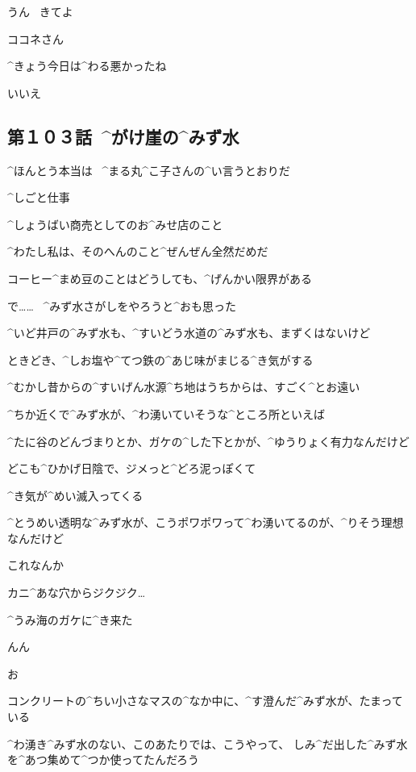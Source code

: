 \Alpha うん
\ きてよ

\page[40]
\Maruko ココネさん

\Maruko ^{きょう}{今日}は^{わる}{悪}かったね

\Kokone いいえ


\subsection{第１０３話\ ^{がけ}{崖}の^{みず}{水}}

\page[43]
\Alpha ^{ほんとう}{本当}は
\ ^{まる}{丸}^{こ}{子}さんの^{い}{言}うとおりだ

\Alpha ^{しごと}{仕事}

\Alpha ^{しょうばい}{商売}としてのお^{みせ}{店}のこと

\Alpha ^{わたし}{私}は、そのへんのこと^{ぜんぜん}{全然}だめだ

\page[44]
\Alpha コーヒー^{まめ}{豆}のことはどうしても、^{げんかい}{限界}がある

\Alpha で……
\ ^{みず}{水}さがしをやろうと^{おも}{思}った

\Alpha ^{いど}{井戸}の^{みず}{水}も、^{すいどう}{水道}の^{みず}{水}も、まずくはないけど

\Alpha ときどき、^{しお}{塩}や^{てつ}{鉄}の^{あじ}{味}がまじる^{き}{気}がする

\page[45]
\Alpha ^{むかし}{昔}からの^{すいげん}{水源}^{ち}{地}はうちからは、すごく^{とお}{遠}い

\Alpha ^{ちか}{近}くで^{みず}{水}が、^{わ}{湧}いていそうな^{ところ}{所}といえば

\Alpha ^{たに}{谷}のどんづまりとか、ガケの^{した}{下}とかが、^{ゆうりょく}{有力}なんだけど

\page[46]
\Alpha どこも^{ひかげ}{日陰}で、ジメっと^{どろ}{泥}っぽくて

\Alpha ^{き}{気}が^{めい}{滅入}ってくる

\Alpha ^{とうめい}{透明}な^{みず}{水}が、こうポワポワって^{わ}{湧}いてるのが、^{りそう}{理想}なんだけど

\Alpha これなんか

\Alpha カニ^{あな}{穴}からジクジク…

\page[47]
\Alpha ^{うみ}{海}のガケに^{き}{来}た

\Alpha んん

\Alpha お

\page[49]
\Alpha コンクリートの^{ちい}{小}さなマスの^{なか}{中}に、^{す}{澄}んだ^{みず}{水}が、たまっている

\Alpha ^{わ}{湧}き^{みず}{水}のない、このあたりでは、こうやって、
しみ^{だ}{出}した^{みず}{水}を^{あつ}{集}めて^{つか}{使}ってたんだろう

